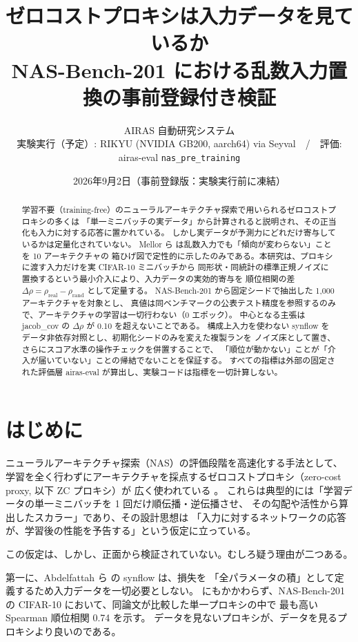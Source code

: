 \documentclass[11pt]{article}
\title{ゼロコストプロキシは入力データを見ているか\\
\large NAS-Bench-201 における乱数入力置換の事前登録付き検証}
\author{AIRAS 自動研究システム\\
\small 実験実行（予定）: RIKYU (NVIDIA GB200, aarch64) via Seyval\ \ /\ \ 評価: airas-eval \texttt{nas\_pre\_training}}
\date{2026年9月2日（事前登録版：実験実行前に凍結）}
\providecommand{\unverified}[1]{#1}
\begin{document}
\maketitle

\begin{abstract}
学習不要（training-free）のニューラルアーキテクチャ探索で用いられるゼロコストプロキシの多くは
「単一ミニバッチの実データ」から計算されると説明され、その正当化も入力に対する応答に置かれている。
しかし実データが予測力にどれだけ寄与しているかは定量化されていない。
Mellor ら \cite{mellor2021naswot} は乱数入力でも「傾向が変わらない」ことを 10 アーキテクチャの
箱ひげ図で定性的に示したのみである。本研究は、プロキシに渡す入力だけを実 CIFAR-10 ミニバッチから
同形状・同統計の標準正規ノイズに置換するという最小介入により、入力データの実効的寄与を
順位相関の差 $\Delta\rho = \rho_{\mathrm{real}} - \rho_{\mathrm{rand}}$ として定量する。
NAS-Bench-201 \cite{dong2020nasbench201} から固定シードで抽出した 1{,}000 アーキテクチャを対象とし、
真値は同ベンチマークの公表テスト精度を参照するのみで、アーキテクチャの学習は一切行わない（0 エポック）。
中心となる主張は jacob\_cov の $\Delta\rho$ が 0.10 を超えないことである。
構成上入力を使わない synflow をデータ非依存対照とし、初期化シードのみを変えた複製ランを
ノイズ床として置き、さらにスコア水準の操作チェックを併置することで、
「順位が動かない」ことが「介入が届いていない」ことの帰結でないことを保証する。
すべての指標は外部の固定された評価層 airas-eval が算出し、実験コードは指標を一切計算しない。
\end{abstract}

\section{はじめに}

ニューラルアーキテクチャ探索（NAS）の評価段階を高速化する手法として、
学習を全く行わずにアーキテクチャを採点するゼロコストプロキシ（zero-cost proxy, 以下 ZC プロキシ）が
広く使われている \cite{abdelfattah2021zerocost,mellor2021naswot}。
これらは典型的には「学習データの単一ミニバッチを 1 回だけ順伝播・逆伝播させ、
その勾配や活性から算出したスカラー」であり、その設計思想は
「入力に対するネットワークの応答が、学習後の性能を予告する」という仮定に立っている。

この仮定は、しかし、正面から検証されていない。むしろ疑う理由が二つある。

第一に、Abdelfattah ら \cite{abdelfattah2021zerocost} の synflow は、損失を
「全パラメータの積」として定義するため入力データを一切必要としない。
にもかかわらず、NAS-Bench-201 の CIFAR-10 において、同論文が比較した単一プロキシの中で
最も高い Spearman 順位相関 \unverified{0.74} を示す。
データを見ないプロキシが、データを見るプロキシより良いのである。
\end{document}
